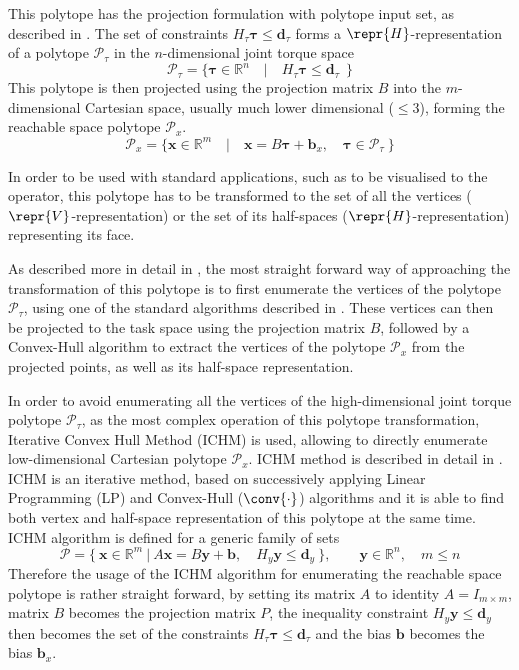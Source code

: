This polytope has the projection formulation with polytope input set, as described in . The set of constraints $H_\tau\bm{\tau}\leq\bm{d}_\tau$ forms a $\repr{H}$-representation of a polytope $\mathcal{P}_\tau$ in the $n$-dimensional joint torque space
\begin{equation}
    \mathcal{P}_\tau = \{ \bm{\tau} \in \mathbb{R}^n \quad| \quad H_\tau\bm{\tau}\leq \bm{d}_\tau ~~\}
\label{eq:polytope_torque}
\end{equation}
This polytope is then projected using the projection matrix $B$ into the $m$-dimensional Cartesian space, usually much lower dimensional ($\leq3$), forming the reachable space polytope $\mathcal{P}_x$.
\begin{equation}
    \mathcal{P}_x = \{ \bm{x} \in \mathbb{R}^m \quad| \quad \bm{x}=B\bm{\tau} + \bm{b}_x, \quad \bm{\tau} \in \mathcal{P}_\tau ~\}
\label{eq:polytope_projection}
\end{equation}

In order to be used with standard applications, such as to be visualised to the operator, this polytope has to be transformed to the set of all the vertices ($\repr{V}$-representation) or the set of its half-spaces ($\repr{H}$-representation) representing its face.

As described more in detail in , the most straight forward way of approaching the transformation of this polytope is to first enumerate the vertices of the polytope $\mathcal{P}_\tau$, using one of the standard algorithms described in . These vertices can then be projected to the task space using the projection matrix $B$, followed by a Convex-Hull algorithm to extract the vertices of the polytope $\mathcal{P}_x$ from the projected points, as well as its half-space representation.

In order to avoid enumerating all the vertices of the high-dimensional joint torque polytope $\mathcal{P}_\tau$, as the most complex operation of this polytope transformation, Iterative Convex Hull Method (ICHM) is used, allowing to directly enumerate low-dimensional Cartesian polytope $\mathcal{P}_x$. ICHM method is described in detail in . ICHM is an iterative method, based on successively applying Linear Programming (LP) and Convex-Hull ($\conv{\cdot}$) algorithms and it is able to find both vertex and half-space representation of this polytope at the same time. ICHM algorithm is defined for a generic family of sets
\begin{equation}
\mathcal{P} = \{ ~\bm{x}\in \mathbb{R}^{m} ~|~ A\bm{x} = B\bm{y} + \bm{b},\quad H_y\bm{y} \leq \bm{d}_y~\}, \qquad \bm{y} \in \mathbb{R}^n,\quad m \leq n
\end{equation}
Therefore the usage of the ICHM algorithm for enumerating the reachable space polytope is rather straight forward, by setting its matrix $A$ to identity $A=I_{m \times m}$, matrix $B$ becomes the projection matrix $P$, the inequality constraint $H_y\bm{y} \leq \bm{d}_y$ then becomes the set of the constraints $H_\tau\bm{\tau}\leq\bm{d}_\tau$ and the bias $\bm{b}$ becomes the bias $\bm{b}_x$.


